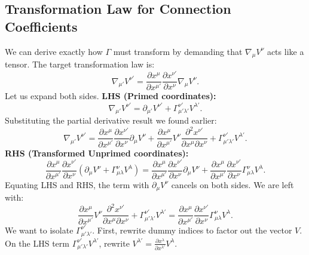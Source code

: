 \documentclass[11pt, a4paper]{report}
\begin{document}
\subsection*{Transformation Law for Connection Coefficients}
We can derive exactly how \(\Gamma\) must transform by demanding that \(\nabla_\mu V^\nu\) acts like a tensor. The target transformation law is:
\begin{equation}
\nabla_{\mu'} V^{\nu'} = \frac{\partial x^\mu}{\partial x^{\mu'}} \frac{\partial x^{\nu'}}{\partial x^\nu} \nabla_\mu V^\nu.
\end{equation}
Let us expand both sides.
\textbf{LHS (Primed coordinates):}
\begin{equation}
\nabla_{\mu'} V^{\nu'} = \partial_{\mu'} V^{\nu'} + \Gamma^{\nu'}_{\mu'\lambda'} V^{\lambda'}.
\end{equation}
Substituting the partial derivative result we found earlier:
\begin{equation}
\label{eq:lhs_gamma_trans}
\nabla_{\mu'} V^{\nu'} = \frac{\partial x^\mu}{\partial x^{\mu'}} \frac{\partial x^{\nu'}}{\partial x^\nu} \partial_\mu V^\nu + \frac{\partial x^\mu}{\partial x^{\mu'}} V^\nu \frac{\partial^2 x^{\nu'}}{\partial x^\mu \partial x^\nu} + \Gamma^{\nu'}_{\mu'\lambda'} V^{\lambda'}.
\end{equation}
\textbf{RHS (Transformed Unprimed coordinates):}
\begin{equation}
\frac{\partial x^\mu}{\partial x^{\mu'}} \frac{\partial x^{\nu'}}{\partial x^\nu} \left( \partial_\mu V^\nu + \Gamma^\nu_{\mu\lambda} V^\lambda \right) = \frac{\partial x^\mu}{\partial x^{\mu'}} \frac{\partial x^{\nu'}}{\partial x^\nu} \partial_\mu V^\nu + \frac{\partial x^\mu}{\partial x^{\mu'}} \frac{\partial x^{\nu'}}{\partial x^\nu} \Gamma^\nu_{\mu\lambda} V^\lambda.
\end{equation}
Equating LHS and RHS, the term with \(\partial_\mu V^\nu\) cancels on both sides. We are left with:
\begin{equation}
\frac{\partial x^\mu}{\partial x^{\mu'}} V^\nu \frac{\partial^2 x^{\nu'}}{\partial x^\mu \partial x^\nu} + \Gamma^{\nu'}_{\mu'\lambda'} V^{\lambda'} = \frac{\partial x^\mu}{\partial x^{\mu'}} \frac{\partial x^{\nu'}}{\partial x^\nu} \Gamma^\nu_{\mu\lambda} V^\lambda.
\end{equation}
We want to isolate \(\Gamma^{\nu'}_{\mu'\lambda'}\). First, rewrite dummy indices to factor out the vector \(V\). On the LHS term \(\Gamma^{\nu'}_{\mu'\lambda'} V^{\lambda'}\), rewrite \(V^{\lambda'} = \frac{\partial x^\lambda}{\partial x^{\lambda'}} V^\lambda\).
\end{document}
